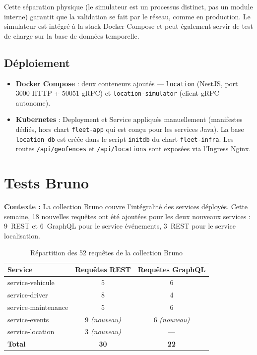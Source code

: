 \documentclass[12pt,a4paper]{article}
\begin{document}
Cette s\'{e}paration physique (le simulateur est un processus distinct, pas un module interne) garantit que la validation se fait par le r\'{e}seau, comme en production. Le simulateur est int\'{e}gr\'{e} \`{a} la stack Docker Compose et peut \'{e}galement servir de test de charge sur la base de donn\'{e}es temporelle.

\subsection{D\'{e}ploiement}

\begin{itemize}[leftmargin=*]
  \item \textbf{Docker Compose} : deux conteneurs ajout\'{e}s --- \texttt{location} (NestJS, port 3000 HTTP + 50051 gRPC) et \texttt{location-simulator} (client gRPC autonome).
  \item \textbf{Kubernetes} : Deployment et Service appliqu\'{e}s manuellement (manifestes d\'{e}di\'{e}s, hors chart \texttt{fleet-app} qui est con\c{c}u pour les services Java). La base \texttt{location\_db} est cr\'{e}\'{e}e dans le script \texttt{initdb} du chart \texttt{fleet-infra}. Les routes \texttt{/api/geofences} et \texttt{/api/locations} sont expos\'{e}es via l'Ingress Nginx.
\end{itemize}

\newpage
\section{Tests Bruno}

\begin{infobox}
\textbf{Contexte :} La collection Bruno couvre l'int\'{e}gralit\'{e} des services d\'{e}ploy\'{e}s. Cette semaine, 18 nouvelles requ\^{e}tes ont \'{e}t\'{e} ajout\'{e}es pour les deux nouveaux services : 9~REST et 6~GraphQL pour le service \'{e}v\'{e}nements, 3~REST pour le service localisation.
\end{infobox}

\begin{table}[H]
\centering
\small
\begin{tabular}{|l|c|c|}
  \hline
  \rowcolor{primary!15}
  \textbf{Service} & \textbf{Requ\^{e}tes REST} & \textbf{Requ\^{e}tes GraphQL} \\
  \hline
  service-vehicule    & 5 & 6 \\
  service-driver      & 8 & 4 \\
  service-maintenance & 5 & 6 \\
  service-events      & 9 \textit{(nouveau)} & 6 \textit{(nouveau)} \\
  service-location    & 3 \textit{(nouveau)} & --- \\
  \hline
  \textbf{Total}      & \textbf{30} & \textbf{22} \\
  \hline
\end{tabular}
\caption{R\'{e}partition des 52 requ\^{e}tes de la collection Bruno}
\end{table}
\end{document}
